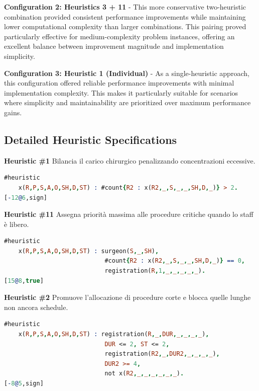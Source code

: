 \documentclass[11pt,a4paper]{article}
\begin{document}
\textbf{Configuration 2: Heuristics 3 + 11} - This more conservative two-heuristic combination provided consistent performance improvements while maintaining lower computational complexity than larger combinations. This pairing proved particularly effective for medium-complexity problem instances, offering an excellent balance between improvement magnitude and implementation simplicity.

\textbf{Configuration 3: Heuristic 1 (Individual)} - As a single-heuristic approach, this configuration offered reliable performance improvements with minimal implementation complexity. This makes it particularly suitable for scenarios where simplicity and maintainability are prioritized over maximum performance gains.

\newpage

\subsection{Detailed Heuristic Specifications}





\textbf{Heuristic \#1}
Bilancia il carico chirurgico penalizzando concentrazioni eccessive.
\begin{lstlisting}[language=Prolog]
#heuristic 
    x(R,P,S,A,O,SH,D,ST) : #count{R2 : x(R2,_,S,_,_,SH,D,_)} > 2. 
[-12@6,sign]
\end{lstlisting}



\textbf{Heuristic \#11 }
Assegna priorità massima alle procedure critiche quando lo staff è libero.
\begin{lstlisting}[language=Prolog]
#heuristic 
    x(R,P,S,A,O,SH,D,ST) : surgeon(S,_,SH), 
                            #count{R2 : x(R2,_,S,_,_,SH,D,_)} == 0,
                            registration(R,1,_,_,_,_,_). 
[15@8,true]
\end{lstlisting}




\textbf{Heuristic \#2}
Promuove l’allocazione di procedure corte e blocca quelle lunghe non ancora schedule.
\begin{lstlisting}[language=Prolog]
#heuristic 
    x(R,P,S,A,O,SH,D,ST) : registration(R,_,DUR,_,_,_,_), 
                            DUR <= 2, ST <= 2, 
                            registration(R2,_,DUR2,_,_,_,_), 
                            DUR2 >= 4, 
                            not x(R2,_,_,_,_,_,_). 
[-8@5,sign]
\end{lstlisting}
\end{document}
